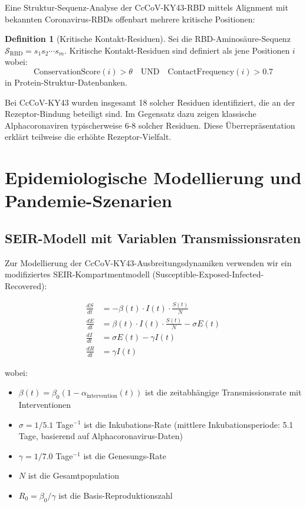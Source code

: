 ﻿\documentclass[11pt,a4paper]{article}
\theoremstyle{definition}
\newtheorem{definition}[theorem]{Definition}
\begin{document}
Eine Struktur-Sequenz-Analyse der CcCoV-KY43-RBD mittels Alignment mit bekannten Coronavi\-rus-RBDs offenbart mehrere kritische Positionen:

\begin{definition}[Kritische Kontakt-Residuen]
Sei die RBD-Aminosäure-Sequenz $\mathcal{S}_{\text{RBD}} = s_1 s_2 \cdots s_m$. Kritische Kontakt-Residuen sind definiert als jene Positionen $i$ wobei:
\[
\text{ConservationScore}(i) > \theta \quad \text{UND} \quad \text{ContactFrequency}(i) > 0.7
\]
in Protein-Struktur-Datenbanken.
\end{definition}

Bei CcCoV-KY43 wurden insgesamt 18 solcher Residuen identifiziert, die an der Rezeptor-Bindung beteiligt sind. Im Gegensatz dazu zeigen klassische Alphacoronaviren typischerweise 6-8 solcher Residuen. Diese Überrepräsentation erklärt teilweise die erhöhte Rezeptor-Vielfalt.

\section{Epidemiologische Modellierung und Pandemie-Szenarien}

\subsection{SEIR-Modell mit Variablen Transmissionsraten}

Zur Modellierung der CcCoV-KY43-Ausbreitungsdynamiken verwenden wir ein modifiziertes SEIR-Kompartmentmodell (Susceptible-Exposed-Infected-Recovered):

\begin{align}
    \frac{dS}{dt} &= -\beta(t) \cdot I(t) \cdot \frac{S(t)}{N} \\
    \frac{dE}{dt} &= \beta(t) \cdot I(t) \cdot \frac{S(t)}{N} - \sigma E(t) \\
    \frac{dI}{dt} &= \sigma E(t) - \gamma I(t) \\
    \frac{dR}{dt} &= \gamma I(t)
\end{align}

wobei:
\begin{itemize}
\item $\beta(t) = \beta_0 (1 - \alpha_{\text{intervention}}(t))$ ist die zeitabhängige Transmissionsrate mit Interventionen
\item $\sigma = 1/5.1$ Tage$^{-1}$ ist die Inkubations-Rate (mittlere Inkubationsperiode: 5.1 Tage, basierend auf Alphacoronavirus-Daten)
\item $\gamma = 1/7.0$ Tage$^{-1}$ ist die Genesungs-Rate
\item $N$ ist die Gesamtpopulation
\item $R_0 = \beta_0 / \gamma$ ist die Basis-Reproduktionszahl
\end{itemize}
\end{document}
